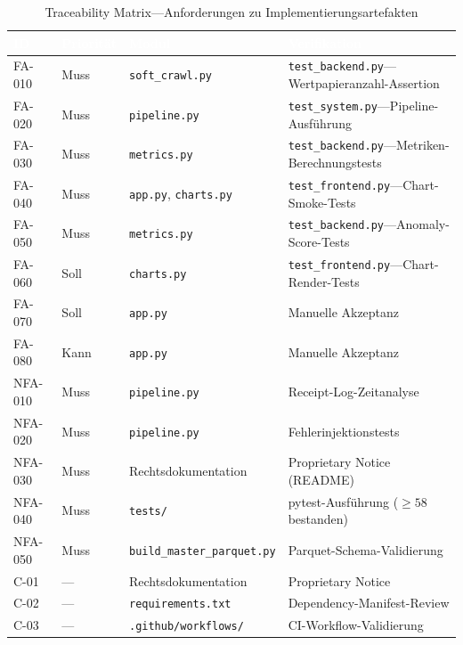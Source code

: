 \documentclass[11pt, a4paper, oneside, openany]{report}
\newcommand{\code}[1]{\texttt{\small\textcolor{DeepNavy}{#1}}}
\begin{document}
\begin{table}[H]
\centering
\caption{Traceability Matrix\;---\;Anforderungen zu Implementierungsartefakten}
\label{tab:traceability}
\sffamily\small
\begin{tabularx}{\textwidth}{l l l X}
  \toprule
  \rowcolor{DeepNavy} \textcolor{white}{\textbf{ID}} & \textcolor{white}{\textbf{Priorität}} & \textcolor{white}{\textbf{Modul}} & \textcolor{white}{\textbf{Verifikation}} \\
  \midrule
  FA-010  & Muss   & \code{soft\_crawl.py}             & \code{test\_backend.py}\;---\;Wertpapieranzahl-Assertion \\
  FA-020  & Muss   & \code{pipeline.py}                & \code{test\_system.py}\;---\;Pipeline-Ausführung \\
  FA-030  & Muss   & \code{metrics.py}                 & \code{test\_backend.py}\;---\;Metriken-Berechnungstests \\
  FA-040  & Muss   & \code{app.py}, \code{charts.py}   & \code{test\_frontend.py}\;---\;Chart-Smoke-Tests \\
  FA-050  & Muss   & \code{metrics.py}                 & \code{test\_backend.py}\;---\;Anomaly-Score-Tests \\
  FA-060  & Soll   & \code{charts.py}                  & \code{test\_frontend.py}\;---\;Chart-Render-Tests \\
  FA-070  & Soll   & \code{app.py}                     & Manuelle Akzeptanz \\
  FA-080  & Kann   & \code{app.py}                     & Manuelle Akzeptanz \\
  \midrule
  NFA-010 & Muss   & \code{pipeline.py}                & Receipt-Log-Zeitanalyse \\
  NFA-020 & Muss   & \code{pipeline.py}                & Fehlerinjektionstests \\
  NFA-030 & Muss   & Rechtsdokumentation               & Proprietary Notice (README) \\
  NFA-040 & Muss   & \code{tests/}                     & pytest-Ausführung ($\geq 58$ bestanden) \\
  NFA-050 & Muss   & \code{build\_master\_parquet.py}   & Parquet-Schema-Validierung \\
  \midrule
  C-01    & ---    & Rechtsdokumentation               & Proprietary Notice \\
  C-02    & ---    & \code{requirements.txt}           & Dependency-Manifest-Review \\
  C-03    & ---    & \code{.github/workflows/}         & CI-Workflow-Validierung \\
  \bottomrule
\end{tabularx}
\end{table}
\end{document}
